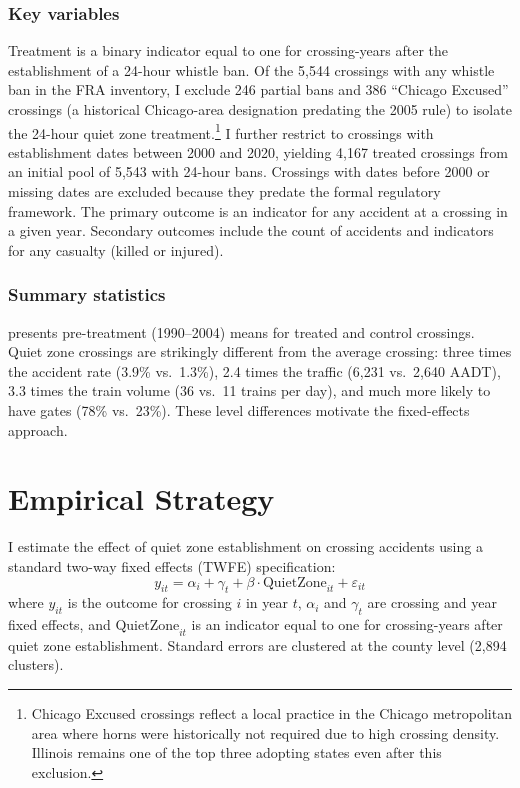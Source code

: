 \documentclass[12pt]{article}
\begin{document}
\subsubsection*{Key variables} Treatment is a binary indicator equal to one for crossing-years after the establishment of a 24-hour whistle ban. Of the 5,544 crossings with any whistle ban in the FRA inventory, I exclude 246 partial bans and 386 ``Chicago Excused'' crossings (a historical Chicago-area designation predating the 2005 rule) to isolate the 24-hour quiet zone treatment.\footnote{Chicago Excused crossings reflect a local practice in the Chicago metropolitan area where horns were historically not required due to high crossing density. Illinois remains one of the top three adopting states even after this exclusion.} I further restrict to crossings with establishment dates between 2000 and 2020, yielding 4,167 treated crossings from an initial pool of 5,543 with 24-hour bans. Crossings with dates before 2000 or missing dates are excluded because they predate the formal regulatory framework. The primary outcome is an indicator for any accident at a crossing in a given year. Secondary outcomes include the count of accidents and indicators for any casualty (killed or injured).

\subsubsection*{Summary statistics}  presents pre-treatment (1990--2004) means for treated and control crossings. Quiet zone crossings are strikingly different from the average crossing: three times the accident rate (3.9\% vs.\ 1.3\%), 2.4 times the traffic (6,231 vs.\ 2,640 AADT), 3.3 times the train volume (36 vs.\ 11 trains per day), and much more likely to have gates (78\% vs.\ 23\%). These level differences motivate the fixed-effects approach.




\section{Empirical Strategy}

I estimate the effect of quiet zone establishment on crossing accidents using a standard two-way fixed effects (TWFE) specification:
\begin{equation}
y_{it} = \alpha_i + \gamma_t + \beta \cdot \text{QuietZone}_{it} + \varepsilon_{it}
\label{eq:twfe}
\end{equation}
where $y_{it}$ is the outcome for crossing $i$ in year $t$, $\alpha_i$ and $\gamma_t$ are crossing and year fixed effects, and $\text{QuietZone}_{it}$ is an indicator equal to one for crossing-years after quiet zone establishment. Standard errors are clustered at the county level (2,894 clusters).
\end{document}
